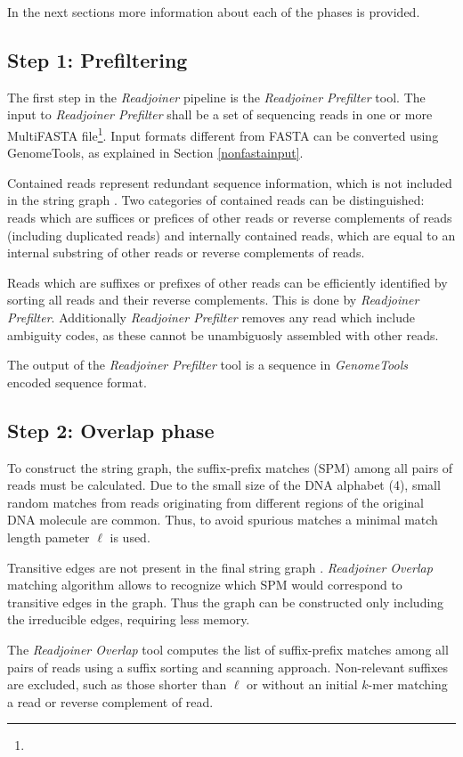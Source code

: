 \documentclass[12pt,titlepage]{article}
\newcommand{\GenomeTools}{\textit{GenomeTools}\xspace}
\newcommand{\Readjoiner}{\textit{Readjoiner}\xspace}
\newcommand{\Rdjprefilter}{\textit{Readjoiner Prefilter}\xspace}
\newcommand{\Rdjoverlap}{\textit{Readjoiner Overlap}\xspace}
\newcommand{\minlen}{\ell}
\begin{document}
In the next sections more information about each of the phases is provided.

\subsection{Step 1: Prefiltering}

The first step in the \Readjoiner pipeline is the \Rdjprefilter tool.
The input to \Rdjprefilter shall be a set of sequencing reads in
one or more MultiFASTA file\footnote{
  }.
Input formats different from FASTA can be converted using GenomeTools,
as explained in Section \ref{nonfastainput}.

Contained reads represent redundant sequence information, which is not included
in the string graph \cite{MYE:2005}. Two categories of contained
reads can be distinguished: reads which are suffices or prefices of other reads or reverse complements
of reads (including duplicated reads) and internally contained reads, which
are equal to an internal substring of other reads or reverse complements of reads.

Reads which are suffixes or prefixes of other reads can be efficiently
identified by sorting all reads
and their reverse complements. This is done by \Rdjprefilter.
Additionally \Rdjprefilter removes any read which include ambiguity codes,
as these cannot be unambiguosly assembled with other reads.

The output of the \Rdjprefilter tool is a sequence in
\GenomeTools encoded sequence format.

\subsection{Step 2: Overlap phase}

To construct the string graph, the suffix-prefix matches (SPM) among all pairs
of reads must be calculated. Due to the small size of the DNA alphabet (4),
small random matches from reads originating from different regions of the
original DNA molecule are common. Thus, to avoid spurious matches a minimal
match length pameter $\minlen$ is used.

Transitive edges are not present in the final string graph \cite{MYE:2005}.
 \Rdjoverlap matching algorithm allows to recognize which SPM would
 correspond to transitive edges in the graph. Thus the graph can be constructed
 only including the irreducible edges, requiring less memory.

The \Rdjoverlap tool computes the list of suffix-prefix matches among
all pairs of reads using a suffix sorting and scanning approach.
Non-relevant suffixes are excluded, such as those shorter
than $\minlen$ or without an initial $k$-mer matching a read or reverse
complement of read.
\end{document}

